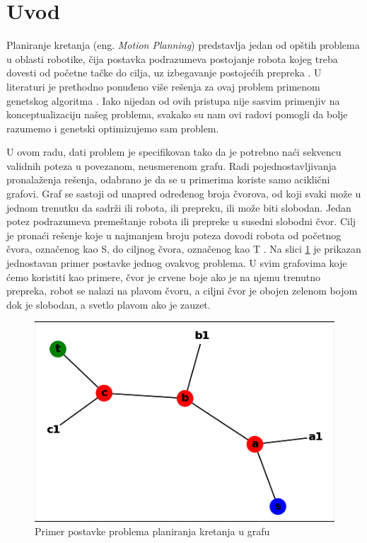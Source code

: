 \documentclass[12pt]{article}
\begin{document}
	\section{Uvod}
	\label{sec:uvod}  
	\par Planiranje kretanja (eng. \textit{Motion Planning}) predstavlja jedan od opštih problema u oblasti robotike, čija postavka podrazumeva postojanje robota kojeg treba dovesti od početne tačke do cilja, uz izbegavanje postojećih prepreka \cite{def}. U literaturi je prethodno ponuđeno više rešenja za ovaj problem primenom genetskog algoritma 
	\cite{gen2, gen1, gen3}. Iako nijedan od ovih pristupa nije sasvim primenjiv na konceptualizaciju našeg problema, svakako su nam ovi radovi pomogli da bolje razumemo i genetski optimizujemo sam problem. 
	\par U ovom radu, dati problem je specifikovan tako da je  potrebno naći sekvencu validnih poteza u povezanom, neusmerenom grafu. Radi pojednostavljivanja pronalaženja rešenja, odabrano je da se u primerima koriste samo aciklični grafovi. Graf se sastoji od unapred određenog broja čvorova, od koji svaki može u jednom trenutku da sadrži ili robota, ili prepreku, ili može biti slobodan. Jedan potez podrazumeva premeštanje robota ili prepreke u susedni slobodni čvor. Cilj je pronaći rešenje koje u najmanjem broju poteza dovodi robota od početnog čvora, označenog kao S, do ciljnog čvora, označenog kao T \cite{glavni}. 
	Na slici \ref{fig:slika1} je prikazan jednostavan primer postavke jednog ovakvog problema. U svim grafovima koje ćemo koristiti kao primere, čvor je crvene boje ako je na njemu trenutno prepreka, robot se nalazi na plavom čvoru, a ciljni čvor je obojen zelenom bojom dok je slobodan, a svetlo plavom ako je zauzet.
	\vspace*{1\baselineskip}
	\begin{figure}[h!]
		\begin{center}
			\includegraphics[scale=1]{graf.png}
		\end{center}
		\caption{Primer postavke problema planiranja kretanja u grafu}
		\label{fig:slika1}
	\end{figure}
	
\end{document}
